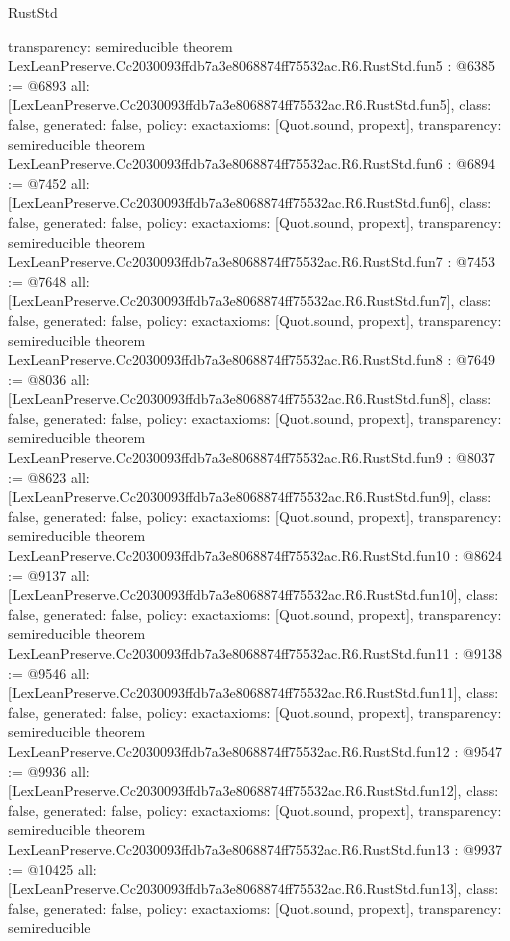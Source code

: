 \begin{lexlean}{RustStd}
\begin{coremodule}
{  transparency: semireducible
}
theorem LexLeanPreserve.Cc2030093ffdb7a3e8068874ff75532ac.R6.RustStd.fun5 : @6385 := @6893 {
  all: [LexLeanPreserve.Cc2030093ffdb7a3e8068874ff75532ac.R6.RustStd.fun5],
  class: false,
  generated: false,
  policy: exact{axioms: [Quot.sound, propext]},
  transparency: semireducible
}
theorem LexLeanPreserve.Cc2030093ffdb7a3e8068874ff75532ac.R6.RustStd.fun6 : @6894 := @7452 {
  all: [LexLeanPreserve.Cc2030093ffdb7a3e8068874ff75532ac.R6.RustStd.fun6],
  class: false,
  generated: false,
  policy: exact{axioms: [Quot.sound, propext]},
  transparency: semireducible
}
theorem LexLeanPreserve.Cc2030093ffdb7a3e8068874ff75532ac.R6.RustStd.fun7 : @7453 := @7648 {
  all: [LexLeanPreserve.Cc2030093ffdb7a3e8068874ff75532ac.R6.RustStd.fun7],
  class: false,
  generated: false,
  policy: exact{axioms: [Quot.sound, propext]},
  transparency: semireducible
}
theorem LexLeanPreserve.Cc2030093ffdb7a3e8068874ff75532ac.R6.RustStd.fun8 : @7649 := @8036 {
  all: [LexLeanPreserve.Cc2030093ffdb7a3e8068874ff75532ac.R6.RustStd.fun8],
  class: false,
  generated: false,
  policy: exact{axioms: [Quot.sound, propext]},
  transparency: semireducible
}
theorem LexLeanPreserve.Cc2030093ffdb7a3e8068874ff75532ac.R6.RustStd.fun9 : @8037 := @8623 {
  all: [LexLeanPreserve.Cc2030093ffdb7a3e8068874ff75532ac.R6.RustStd.fun9],
  class: false,
  generated: false,
  policy: exact{axioms: [Quot.sound, propext]},
  transparency: semireducible
}
theorem LexLeanPreserve.Cc2030093ffdb7a3e8068874ff75532ac.R6.RustStd.fun10 : @8624 := @9137 {
  all: [LexLeanPreserve.Cc2030093ffdb7a3e8068874ff75532ac.R6.RustStd.fun10],
  class: false,
  generated: false,
  policy: exact{axioms: [Quot.sound, propext]},
  transparency: semireducible
}
theorem LexLeanPreserve.Cc2030093ffdb7a3e8068874ff75532ac.R6.RustStd.fun11 : @9138 := @9546 {
  all: [LexLeanPreserve.Cc2030093ffdb7a3e8068874ff75532ac.R6.RustStd.fun11],
  class: false,
  generated: false,
  policy: exact{axioms: [Quot.sound, propext]},
  transparency: semireducible
}
theorem LexLeanPreserve.Cc2030093ffdb7a3e8068874ff75532ac.R6.RustStd.fun12 : @9547 := @9936 {
  all: [LexLeanPreserve.Cc2030093ffdb7a3e8068874ff75532ac.R6.RustStd.fun12],
  class: false,
  generated: false,
  policy: exact{axioms: [Quot.sound, propext]},
  transparency: semireducible
}
theorem LexLeanPreserve.Cc2030093ffdb7a3e8068874ff75532ac.R6.RustStd.fun13 : @9937 := @10425 {
  all: [LexLeanPreserve.Cc2030093ffdb7a3e8068874ff75532ac.R6.RustStd.fun13],
  class: false,
  generated: false,
  policy: exact{axioms: [Quot.sound, propext]},
  transparency: semireducible
}
\end{coremodule}
\end{lexlean}
